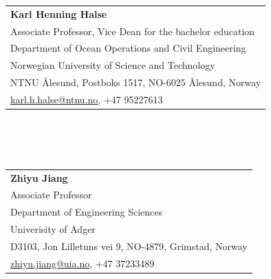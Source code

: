 \documentclass[10pt]{ctexart}
\begin{document}
{        \begin{tabular}{@{}l@{}}
        \textbf{Karl Henning Halse}\\
        Associate Professor, Vice Dean for the bachelor education\\
    	Department of Ocean Operations and Civil Engineering\\
        Norwegian University of Science and Technology\\
        NTNU {\AA}lesund, Postboks 1517, NO-6025 {\AA}lesund, Norway\\
        \url{karl.h.halse@ntnu.no}, +47 95227613
        \end{tabular}\\
        \\ \\
        \begin{tabular}{@{}l@{}}
        \textbf{Zhiyu Jiang}\\
        Associate Professor\\
    	Department of Engineering Sciences\\
        Univerisity of Adger\\
        D3103, Jon Lilletuns vei 9, NO-4879, Grimstad, Norway\\
        \url{zhiyu.jiang@uia.no}, +47 37233489
        \end{tabular}
}\else{

}\fi
\end{document}
